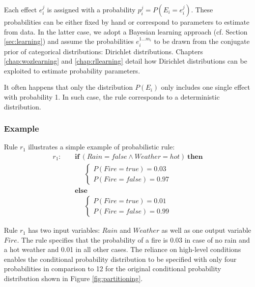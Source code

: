 Each effect $e_i^j$ is assigned with a probability $p_i^j = P(E_i = e_i^j)$.  These probabilities can be either 
fixed by hand or correspond to parameters to estimate from data. In the latter case, we adopt a Bayesian learning approach (cf. Section \ref{sec:learning}) and assume the probabilities $e_i^{1...m_i}$ to be drawn from the conjugate prior of categorical distributions: Dirichlet distributions. Chapters \ref{chap:wozlearning} and \ref{chap:rllearning} detail how Dirichlet distributions can be exploited to estimate probability parameters. 

It often happens that only the distribution $P(E_i)$ only includes one single effect with probability 1.  In such case, the rule corresponds to a deterministic distribution. 

\subsubsection*{Example}

Rule $r_1$ illustrates a simple example of probabilistic rule:
\begin{align*}
r_1: \ \ \ \ \ & \textbf{if} \ (\mathit{Rain}\!=\!\mathit{false} \land \mathit{Weather}\!=\!\mathit{hot}) \ \textbf{then} \\
& \;\;\;\;\;  \begin{cases}
 P(\mathit{Fire}\!=\!\mathit{true}) = 0.03 \\ 
P(\mathit{Fire}\!=\!\mathit{false}) = 0.97
\end{cases} \\ 
& \textbf{else} \\
& \;\;\;\;\; \begin{cases}
P(\mathit{Fire}\!=\!\mathit{true}) = 0.01 \\
P(\mathit{Fire}\!=\!\mathit{false}) = 0.99
\end{cases} 
\end{align*}

Rule $r_1$ has two input variables: $\mathit{Rain}$ and $\mathit{Weather}$ as well as one output variable $\mathit{Fire}$. The rule specifies that the probability of a fire is 0.03 in case of no rain and a hot weather and 0.01 in all other cases.  The reliance on high-level conditions enables the conditional probability distribution to be specified with only four probabilities in comparison to 12 for the original conditional probability distribution shown in Figure \ref{fig:partitioning}. 


